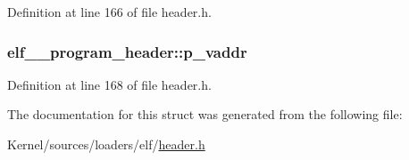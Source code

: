 Definition at line 166 of file header.h.

\hypertarget{structelf__32__program__header_ab11f74e50c7ef5781fceeb94d729d423}{
\subsubsection[{p\_\-vaddr}]{ {\bf elf\_\_\-program\_\-header::p\_\-vaddr}}}
\label{structelf__32__program__header_ab11f74e50c7ef5781fceeb94d729d423}


Definition at line 168 of file header.h.



The documentation for this struct was generated from the following file:\begin{DoxyCompactItemize}
\item 
Kernel/sources/loaders/elf/\hyperlink{header_8h}{header.h}\end{DoxyCompactItemize}
